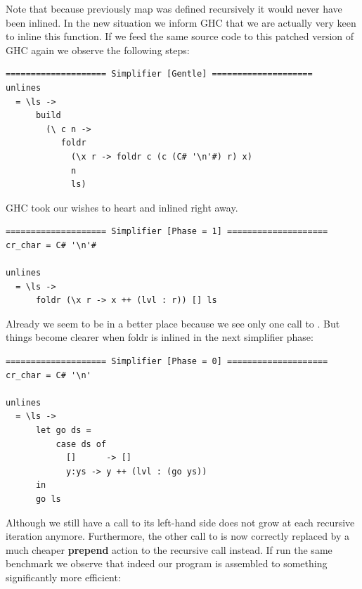 Note that because previously map was defined recursively it would never have been inlined. In the new situation we inform GHC that we are actually very keen to
inline this function. If we feed the same source code to this patched version of GHC again we observe the following steps:

\begin{listing}[H]
\begin{verbatim}
==================== Simplifier [Gentle] ====================
unlines
  = \ls ->
      build
        (\ c n ->
           foldr
             (\x r -> foldr c (c (C# '\n'#) r) x)
             n
             ls)
\end{verbatim}
\end{listing}

GHC took our wishes to heart and inlined  right away.

\begin{listing}[H]
\begin{verbatim}
==================== Simplifier [Phase = 1] ====================
cr_char = C# '\n'#

unlines
  = \ls ->
      foldr (\x r -> x ++ (lvl : r)) [] ls
\end{verbatim}
\end{listing}

Already we seem to be in a better place because we see only one call to \mono{++}. 
But things become clearer when foldr is inlined in the next simplifier phase:

\begin{listing}[H]
\begin{verbatim}
==================== Simplifier [Phase = 0] ====================
cr_char = C# '\n'

unlines
  = \ls ->
      let go ds =
          case ds of
            []      -> []
            y:ys -> y ++ (lvl : (go ys))
      in
      go ls
\end{verbatim}
\end{listing}

Although we still have a call to \mono{++} its left-hand side does not grow at each recursive iteration anymore. Furthermore, the other call to \mono{++} is
now correctly replaced by a much cheaper \textbf{prepend} action to the recursive call instead.
If run the same benchmark we observe that indeed our program is assembled to something significantly more efficient:

